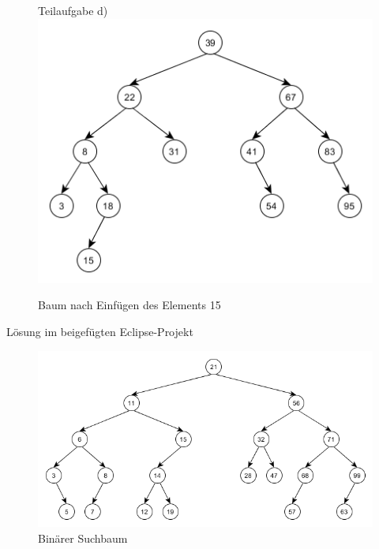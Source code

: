 \documentclass[12pt]{scrartcl}
\begin{document}
\begin{figure}[h!]
\begin{center}
Teilaufgabe d)
\includegraphics[scale=0.8]{Aufgabe2d)B6.png}
\caption{Baum nach Einfügen des Elements 15}
\end{center}
\end{figure}

\exercise{}
Lösung im beigefügten Eclipse-Projekt

\exercise{}
\begin{figure}[h!]
\begin{center}
\includegraphics[scale=0.8]{Aufgabe4Binaerbaum.png}
\caption{Binärer Suchbaum}
\end{center}
\end{figure}

\end{document}
